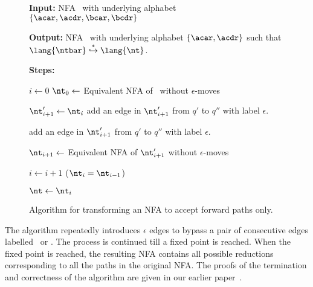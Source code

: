 \begin{figure}[t]
\begin{boxedminipage}{\textwidth}
\begin{center}
  \raggedright  {\bf  Input:}  NFA \ntbar\  with  underlying
  alphabet $\lbrace \acar, \acdr, \bcar, \bcdr\rbrace$ \\
%
  \raggedright{\bf Output:} NFA  \nt\ with  underlying
  alphabet $\lbrace \acar, \acdr \rbrace$ such that
  $\lang{\ntbar} \stackrel{*}{\hookrightarrow} \lang{\nt}$.
  \\
%  
  
  \raggedright{\bf Steps:}
 \begin{algorithmic}
   \STATE $i \leftarrow 0$ 
   \STATE $\nt_0 \leftarrow$ Equivalent NFA of \ntbar\
   without $\epsilon$-moves \cite{hopcraft90toc}

   \REPEAT
   \STATE $\nt'_{i+1} \leftarrow \nt_i$
   \STATE add an edge in $\nt'_{i+1}$ from $q'$ to $q''$ with
   label $\epsilon$.
   \ENDFOR

   \STATE add an edge in $\nt'_{i+1}$ from $q'$ to $q''$ with
     label $\epsilon$.
   \ENDFOR
   
   \STATE   $\nt_{i+1}    \leftarrow$   Equivalent   NFA   of
   $\nt'_{i+1}$ without $\epsilon$-moves

   \STATE $i \leftarrow i+1$
   \UNTIL ($\nt_{i} = \nt_{i-1}$)
   
   \STATE $\nt \leftarrow \nt_i$
 \end{algorithmic}
\end{center}
\end{boxedminipage}
 \caption{Algorithm for transforming an NFA to  accept forward
   paths only.}\label{algo:simplify-NFA} \figrule
\end{figure}
The algorithm repeatedly introduces  $\epsilon$ edges to bypass a
pair of consecutive edges labelled \bcar\acar\ or \bcdr\acdr.  The
process is  continued till  a fixed point  is reached.   When the
fixed point  is reached, the resulting NFA  contains all possible
reductions corresponding  to all the  paths in the  original NFA.
The proofs  of the termination  and correctness of  the algorithm
are given in our earlier paper~\cite{karkare07liveness}.

